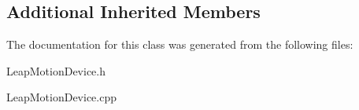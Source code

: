 \subsection*{Additional Inherited Members}


The documentation for this class was generated from the following files\+:\begin{DoxyCompactItemize}
\item 
Leap\+Motion\+Device.\+h\item 
Leap\+Motion\+Device.\+cpp\end{DoxyCompactItemize}
